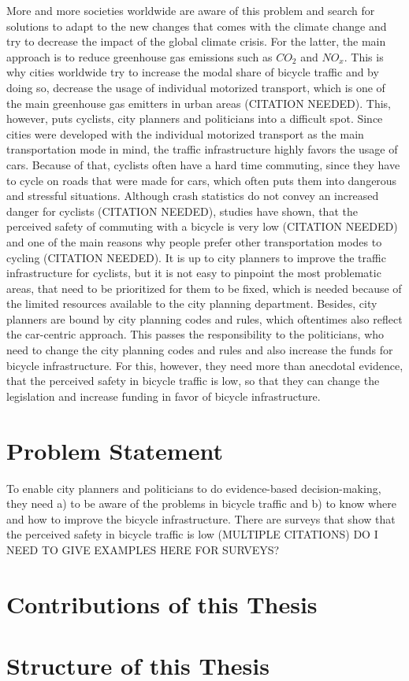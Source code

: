 More and more societies worldwide are aware of this problem and search for solutions to adapt to the new changes that comes with the climate change and try to decrease the impact of the global climate crisis.
For the latter, the main approach is to reduce greenhouse gas emissions such as $CO_{2}$ and $NO_{x}$.
This is why cities worldwide try to increase the modal share of bicycle traffic and by doing so, decrease the usage of individual motorized transport, which is one of the main greenhouse gas emitters in urban areas (CITATION NEEDED).
This, however, puts cyclists, city planners and politicians into a difficult spot.
Since cities were developed with the individual motorized transport as the main transportation mode in mind, the traffic infrastructure highly favors the usage of cars.
Because of that, cyclists often have a hard time commuting, since they have to cycle on roads that were made for cars, which often puts them into dangerous and stressful situations.
Although crash statistics do not convey an increased danger for cyclists (CITATION NEEDED), studies have shown, that the perceived safety of commuting with a bicycle is very low (CITATION NEEDED) and one of the main reasons why people prefer other transportation modes to cycling (CITATION NEEDED).
It is up to city planners to improve the traffic infrastructure for cyclists, but it is not easy to pinpoint the most problematic areas, that need to be prioritized for them to be fixed, which is needed because of the limited resources available to the city planning department.
Besides, city planners are bound by city planning codes and rules, which oftentimes also reflect the car-centric approach.
This passes the responsibility to the politicians, who need to change the city planning codes and rules and also increase the funds for bicycle infrastructure.
For this, however, they need more than anecdotal evidence, that the perceived safety in bicycle traffic is low, so that they can change the legislation and increase funding in favor of bicycle infrastructure.

\section{Problem Statement}
\label{sec:problem}
To enable city planners and politicians to do evidence-based decision-making, they need a) to be aware of the problems in bicycle traffic and b) to know where and how to improve the bicycle infrastructure.
There are surveys that show that the perceived safety in bicycle traffic is low (MULTIPLE CITATIONS)
DO I NEED TO GIVE EXAMPLES HERE FOR SURVEYS?

\section{Contributions of this Thesis}
\label{sec:contributions}

\section{Structure of this Thesis}
\label{sec:structure}